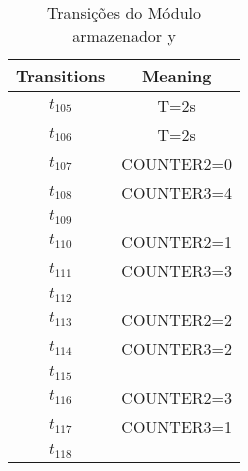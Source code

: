 \begin{table}[htbp]
\caption{Transições do Módulo armazenador y}
\centering
\begin{tabular}{c|c}
Transitions & Meaning\\
\hline
\hyperlink{partialNet:tt105}{\hypertarget{partialTable:tt105}{$t_{105}$}} & T=2s\\
\hyperlink{partialNet:tt106}{\hypertarget{partialTable:tt106}{$t_{106}$}} & T=2s\\
\hyperlink{partialNet:t107}{\hypertarget{partialTable:t107}{$t_{107}$}} & COUNTER2=0\\
\hyperlink{partialNet:t108}{\hypertarget{partialTable:t108}{$t_{108}$}} & COUNTER3=4\\
\hyperlink{partialNet:t109}{\hypertarget{partialTable:t109}{$t_{109}$}} & \\
\hyperlink{partialNet:t110}{\hypertarget{partialTable:t110}{$t_{110}$}} & COUNTER2=1\\
\hyperlink{partialNet:t111}{\hypertarget{partialTable:t111}{$t_{111}$}} & COUNTER3=3\\
\hyperlink{partialNet:t112}{\hypertarget{partialTable:t112}{$t_{112}$}} & \\
\hyperlink{partialNet:t113}{\hypertarget{partialTable:t113}{$t_{113}$}} & COUNTER2=2\\
\hyperlink{partialNet:t114}{\hypertarget{partialTable:t114}{$t_{114}$}} & COUNTER3=2\\
\hyperlink{partialNet:t115}{\hypertarget{partialTable:t115}{$t_{115}$}} & \\
\hyperlink{partialNet:t116}{\hypertarget{partialTable:t116}{$t_{116}$}} & COUNTER2=3\\
\hyperlink{partialNet:t117}{\hypertarget{partialTable:t117}{$t_{117}$}} & COUNTER3=1\\
\hyperlink{partialNet:t118}{\hypertarget{partialTable:t118}{$t_{118}$}} & \\
\end{tabular}
\end{table}
